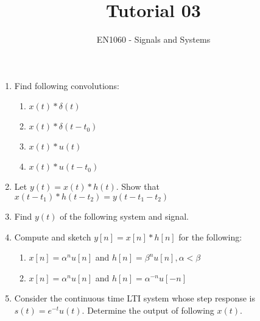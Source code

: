 \documentclass[12pt]{article}
\begin{document}


\title{Tutorial 03}%
\author{EN1060 - Signals and Systems\\} %

\maketitle
\begin{enumerate}
\item Find following convolutions:
\begin{enumerate}
    \item $x(t)\ast\delta(t)$
    \item $x(t)\ast\delta(t-t_0)$
    \item $x(t)\ast u(t)$
    \item $x(t)\ast u(t-t_0)$
\end{enumerate}

\item Let $y(t) = x(t)\ast h(t)$. Show that $x(t-t_1)\ast h(t-t_2) = y(t-t_1-t_2)$

\item Find $y(t)$ of the following system and signal.

\begin{figure}[h]
    \centering
    
\caption{}
\end{figure}

\item Compute and sketch $y[n] = x[n]\ast h[n]$ for the following:

\begin{enumerate}
    \item $ x[n] = \alpha^{n}u[n]$ \hspace{1cm} and \hspace{1cm} $h[n] = \beta^{n}u[n] , \alpha < \beta$
    \item $x[n] = \alpha^{n}u[n]$  \hspace{1cm} and \hspace{1cm} $h[n] = \alpha^{-n}u[-n]$
\end{enumerate}

\item Consider the continuous time LTI system whose step response is $s(t) = e^{-t}u(t)$. Determine the output of following $x(t)$.


\end{enumerate}
\end{document}
